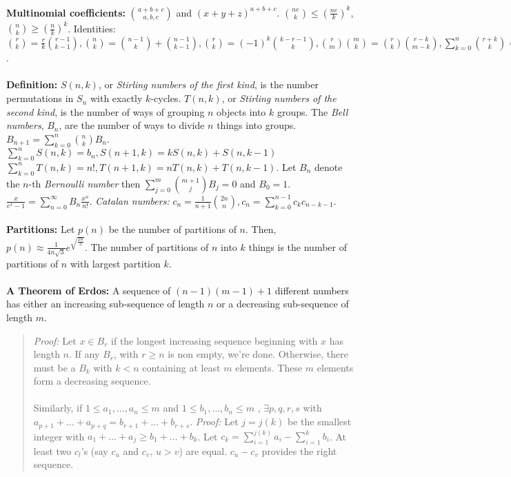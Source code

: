 {\bf Multinomial coefficients:} ${ {a+b+c} \choose {a, b, c}}$ and
$(x+y+z)^{a+b+c}$.
${ {ne} \choose k} \leq ({\frac {ne} {k}})^k$,
${n \choose k} \geq ({\frac n k})^k$.  Identities:
$
{r \choose k} = {\frac {r} {k}}{r-1 \choose k-1},
{n \choose k} = {n-1 \choose k} + {n-1 \choose k-1},
{r \choose k} = {{(-1)}^{k}}{k-r-1 \choose k},
{r \choose m} {m \choose k} = {r \choose k} {r-k \choose m-k} ,
\sum_{k=0}^{n}{r+k \choose k} = {{r+n+1} \choose {n}},
\sum_{k=0}^{n}{k \choose m} = {n+1 \choose m+1},
\sum_{k=0}^{n}{r \choose k}{s \choose n-k}  = {r+s \choose n},
\sum_{k=a}^{b-1} f(k)= \int_{k=a}^{b-1} f(x) dx +
\sum_{k=1}^m {\frac {B_{k}} {m!}} f^{(k-1)}(x)^{b}_{a}+ R_{m},
a_{n} T_{n} = b_{n} T_{n-1} + c_{n} \rightarrow
s_{n} a_{n} T_{n} = s_{n} b_{n} T_{n-1} + s_{n} c_{n} ,
s_{n} b_{n} = s_{n-1} a_{n-1},
R_{n} = s_{n} a_{n} T_{n},
R_{n} = R_{n-1} +s_{n} c_{n},
{-n \choose r}= (-1)^r {n+r-1 \choose r},
(1+x)^{-n} = 1 + {-n \choose 1} x^{-1} + \ldots + {-n \choose n} x^{-n}$.
\\
\\
{\bf Definition:} $S(n,k)$, or  
\emph{Stirling numbers of the first kind}, is the number permutations in
$S_n$ with exactly $k$-cycles.
$T(n, k)$, or \emph{Stirling numbers of the second kind}, is the number of ways of
grouping $n$ objects into $k$ groups.
The \emph{Bell numbers}, $B_n$, are the number of ways to divide $n$ things into groups.
$B_{n+1}= \sum_{k=0}^n {n \choose k} B_n $.
$ \sum_{k=0}^{n} S(n,k) = b_{n} , S(n+1, k) = k S(n,k) + S(n, k-1)$
$ \sum_{k=0}^{n} T(n,k) = n! , T(n+1, k) = n T(n,k) + T(n, k-1)$.
Let $B_{n}$ denote the $n$-th \emph{Bernoulli number} then
$\sum_{j=0}^m {{m+1} \choose j} B_j = 0$
and $B_0=1$.  ${\frac x {e^x-1}} = \sum_{n=0}^{\infty} B_n {\frac {x^n} {n!}}$.
\emph{Catalan numbers:}
$c_{n} = \frac {1} {n+1} {2n \choose n} , c_n = \sum_{k=0}^{n-1} c_k c_{n-k-1}$.
\\
\\
{\bf Partitions:} Let $p(n)$ be the number of partitions of $n$.  Then,
$p(n) \approx \frac{1}{4n \sqrt{3}} e^{\sqrt{\frac {2n} {3}}}$.
The number of partitions of $n$ into $k$ things is the number of partitions
of $n$ with largest partition $k$.
\\
\\
{\bf A Theorem of Erdos:}
A sequence of $(n-1)(m-1) + 1$ different numbers has either an increasing
sub-sequence of length $n$ or a decreasing sub-sequence of length $m$.
\begin{quote}
\emph{Proof:} 
Let $x \in B_r$ if the longest increasing sequence beginning with
$x$ has length $n$.  If any $B_r$, with $r \geq n$ is non empty, we're done.
Otherwise, there must be a $B_k$ with $k<n$ containing at least $m$ elements.
These $m$ elements form a decreasing sequence.
\\
\\
Similarly, if $1 \leq a_1 , \ldots , a_n \leq m$ and
$1 \leq b_1 , \ldots , b_n \leq m$ ,  $\exists p,q,r,s$ with
$a_{p+1} + \ldots + a_{p+q} = b_{r+1} + \ldots + b_{r+s}$.
\emph{Proof:} Let $j=j(k)$ be the smallest integer with
$a_1 + \ldots + a_j \geq
b_1 + \ldots + b_k$.  Let $c_k = \sum_{i=1}^{j(k)} a_i - \sum_{i=1}^k b_i$.
At least two $c_l$'s (say $c_u$ and $c_v$, $u>v$) are equal.  $c_u-c_v$
provides the right sequence.
\end{quote}
